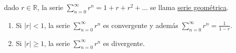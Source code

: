 \documentclass{article}
\theoremstyle{definition}
\theoremstyle{remark}
\begin{document}
\begin{defi}
  dado $r \in \mathbb{R}$, la serie $\sum_{n=0}^{\infty}r^n=1+r+r^2+\dots $ se llama \underline{serie geométrica}.
\end{defi}

\pagebreak
\begin{teo}
  \begin{enumerate} \; \\
    \item Si $|r|<1$, la serie $\sum_{n=0}^{\infty}{r^n}$ es convergente y además $\sum_{n=0}^{\infty}{r^n} = \frac{1}{1-r}$.
     \item Si $|r| \geq 1$, la serie $\sum_{n=0}^{\infty}{r^n}$
      es divergente.
    \end{enumerate}
\end{teo}
\end{document}
